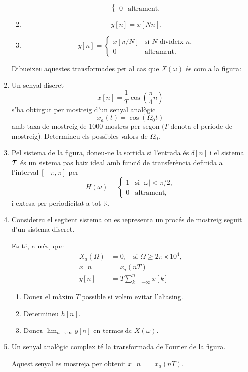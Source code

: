 \documentclass[a4paper,12pt]{article}
\newcommand\cT{{\cal T}}
\newcommand\bR{\mathbb{R}}
\def\figura#1{\begin{figure}[htbp]\centering\end{figure}\par}
\begin{document}
\begin{enumerate}
\begin{enumerate}
$$\begin{cases}
      0 & \text{altrament.}
    \end{cases}
    $$
  \item
    $$y[n]=x[Nn].$$
  \item
    $$y[n]=\begin{cases}
      x[n/N] & \text{si $N$ divideix $n$,}\\
      0 & \text{altrament.}
    \end{cases}
    $$
  \end{enumerate}
  Dibueixeu aquestes transformades per al cas que $X(\omega)$ és com a la
  figura:
  \figura{probl3.exc2.pstex_t}
\item Un senyal discret
  $$x[n]=\frac{1}{T} \cos\left(\frac\pi4 n\right)$$
  s'ha obtingut per mostreig d'un senyal analògic
  $$x_a(t)=\cos(\Omega_0 t)$$
  amb taxa de mostreig de 1000 mostres per segon ($T$ denota el periode de mostreig). Determineu els
  possibles valors de $\Omega_0$.
\item Pel sistema de la figura, doneu-ne la sortida si l'entrada és
  $\delta[n]$ i el sistema $\cT$ és un sistema pas baix ideal amb
  funció de transferència definida a l'interval $[-\pi,\pi]$ per
  $$H(\omega)=\begin{cases}
    1 & \text{si $|\omega|<\pi/2$,} \\
    0 & \text{altrament,}
  \end{cases}$$
  i extesa per periodicitat a tot $\bR$.
  \figura{probl3.exc3.pstex_t}
\item Considereu el següent sistema on es representa un procés de
  mostreig seguit d'un sistema discret.
  \figura{probl3.exc4.pstex_t}
  Es té, a més, que
  \begin{align*}
    X_a(\Omega)&=0,\quad\text{si $\Omega\ge 2\pi\times10^4$,}\\
    x[n]&=x_a(nT)\\
    y[n]&=T\sum_{k=-\infty}^n x[k]
  \end{align*}
  \begin{enumerate}
  \item Doneu el màxim $T$ possible si volem evitar l'aliasing.
  \item Determineu $h[n]$.
  \item Doneu $\lim_{n\to\infty}y[n]$ en termes de $X(\omega)$.
  \end{enumerate}
\item Un senyal analògic complex té la transformada de Fourier de la figura.
  \figura{probl3.exc5.pstex_t}
  Aquest senyal es mostreja per obtenir $x[n]=x_a(nT)$.
  \begin{enumerate}

\end{enumerate}
\end{enumerate}
\end{document}
